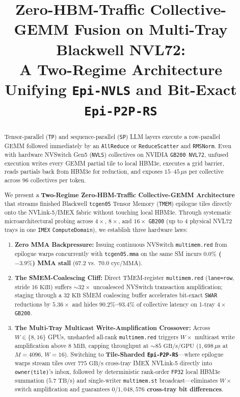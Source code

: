 \documentclass[conference,10pt]{IEEEtran}
\title{Zero-HBM-Traffic Collective-GEMM Fusion on Multi-Tray Blackwell NVL72:\\
A Two-Regime Architecture Unifying \texttt{Epi-NVLS} and Bit-Exact \texttt{Epi-P2P-RS}}
\author{\IEEEauthorblockN{Rishi Vinodkumar}}
\begin{document}
\maketitle

\begin{abstract}
Tensor-parallel (\texttt{TP}) and sequence-parallel (\texttt{SP}) LLM layers execute a row-parallel GEMM followed immediately by an \texttt{AllReduce} or \texttt{ReduceScatter} and \texttt{RMSNorm}. Even with hardware NVSwitch Gen5 (\texttt{NVLS}) collectives on NVIDIA \texttt{GB200 NVL72}, unfused execution writes every GEMM partial tile to local HBM3e, executes a grid barrier, reads partials back from HBM3e for reduction, and exposes $15$--$45\,\mu\text{s}$ per collective across $96$ collectives per token.

We present a \textbf{Two-Regime Zero-HBM-Traffic Collective-GEMM Architecture} that streams finished Blackwell \texttt{tcgen05} Tensor Memory (\texttt{TMEM}) epilogue tiles directly onto the NVLink-5/IMEX fabric without touching local HBM3e. Through systematic microarchitectural probing across $4\times$, $8\times$, and $16\times$ \texttt{GB200} (up to $4$ physical NVL72 trays in one \texttt{IMEX} \texttt{ComputeDomain}), we establish three hardware laws:
\begin{enumerate}
    \item \textbf{Zero MMA Backpressure:} Issuing continuous NVSwitch \texttt{multimem.red} from epilogue warps concurrently with \texttt{tcgen05.mma} on the same SM incurs \textbf{$0.0\%$ ($-3.9\%$) MMA stall} ($67.2$ vs.\ $70.0\text{ cyc/MMA}$).
    \item \textbf{The SMEM-Coalescing Cliff:} Direct TMEM-register \texttt{multimem.red} (\texttt{lane=row}, stride $16\text{ KiB}$) suffers $\sim 32\times$ uncoalesced NVSwitch transaction amplification; staging through a $32\text{ KB}$ SMEM coalescing buffer accelerates bit-exact \texttt{SWAR} reductions by \textbf{$5.36\times$} and hides \textbf{$90.2\%$--$93.4\%$} of collective latency on 1-tray $4{\times}$\texttt{GB200}.
    \item \textbf{The Multi-Tray Multicast Write-Amplification Crossover:} Across $W \in \{8, 16\}$ GPUs, unsharded all-rank \texttt{multimem.red} triggers $W\times$ multicast write amplification above $8\text{ MiB}$, capping throughput at $\sim 85\text{ GB/s/GPU}$ ($1{,}698\,\mu\text{s}$ at $M{=}4096$, $W{=}16$). Switching to \textbf{Tile-Sharded \texttt{Epi-P2P-RS}}---where epilogue warps stream tiles over $775\text{ GB/s}$ cross-tray IMEX NVLink-5 directly into \texttt{owner(tile)}'s inbox, followed by deterministic rank-order \texttt{FP32} local HBM3e summation ($5.7\text{ TB/s}$) and single-writer \texttt{multimem.st} broadcast---eliminates $W\times$ switch amplification and guarantees \textbf{$0 / 1{,}048{,}576$ cross-tray bit differences}.

\end{enumerate}
\end{abstract}
\end{document}
